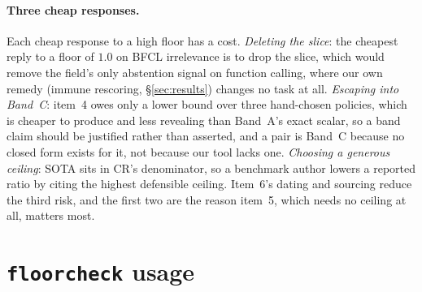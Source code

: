 \documentclass{article}
\theoremstyle{plain}
\theoremstyle{definition}
\newcommand{\floorcheck}{\texttt{floorcheck}}
\newcommand{\CR}{\mathrm{CR}}
\begin{document}
\paragraph{Three cheap responses.} Each cheap response to a high floor has a cost. \emph{Deleting the slice}: the cheapest reply to a floor of $1.0$ on BFCL irrelevance is to drop the slice, which would remove the field's only abstention signal on function calling, where our own remedy (immune rescoring, \S\ref{sec:results}) changes no task at all. \emph{Escaping into Band~C}: item~4 owes only a lower bound over three hand-chosen policies, which is cheaper to produce and less revealing than Band~A's exact scalar, so a band claim should be justified rather than asserted, and a pair is Band~C because no closed form exists for it, not because our tool lacks one. \emph{Choosing a generous ceiling}: SOTA sits in $\CR$'s denominator, so a benchmark author lowers a reported ratio by citing the highest defensible ceiling. Item~6's dating and sourcing reduce the third risk, and the first two are the reason item~5, which needs no ceiling at all, matters most.

\section{\floorcheck{} usage}
\label{app:floorcheck}
\end{document}
